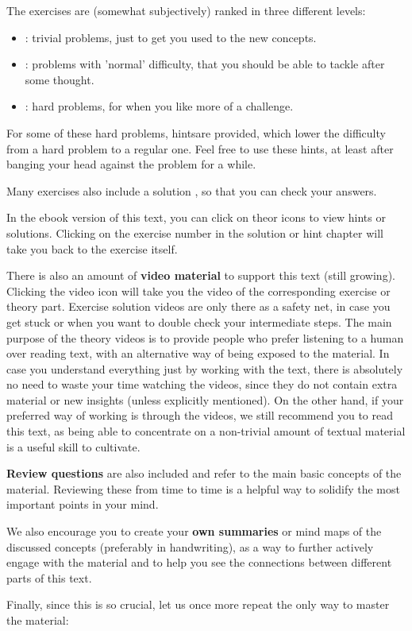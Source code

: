 The exercises are (somewhat subjectively) ranked in three different levels:

\begin{itemize}
\item \iconoffset\trivial : trivial problems, just to get you used to the new concepts.
\item \iconoffset\normal : problems with 'normal' difficulty, that you should be able to tackle after some thought.
\item \iconoffset\hard : hard problems, for when you like more of a challenge.
\end{itemize}

For some of these hard problems, hints\iconoffset\hint are provided, which lower the difficulty from a hard problem to a regular one. Feel free to use these hints, at least after banging your head against the problem for a while.

Many exercises also include a solution \iconoffset\solution, so that you can check your answers.

In the ebook version of this text, you can click on the\iconoffset\hint or \iconoffset\solution icons to view hints or solutions. Clicking on the exercise number in the solution or hint chapter will take you back to the exercise itself.

There is also an amount of \textbf{video material} to support this text (still growing). Clicking the video icon \iconoffset\youtube will take you the video of the corresponding exercise or theory part. Exercise solution videos are only there as a safety net, in case you get stuck or when you want to double check your intermediate steps. The main purpose of the theory videos is to provide people who prefer listening to a human over reading text, with an alternative way of being exposed to the material. In case you understand everything just by working with the text, there is absolutely no need to waste your time watching the videos, since they do not contain extra material or new insights (unless explicitly mentioned). On the other hand, if your preferred way of working is through the videos, we still recommend you to read this text, as being able to concentrate on a non-trivial amount of textual material is a useful skill to cultivate.

\textbf{Review questions} are also included and refer to the main basic concepts of the material. Reviewing these from time to time is a helpful way to solidify the most important points in your mind.

We also encourage you to create your \textbf{own summaries} or mind maps of the discussed concepts (preferably in handwriting), as a way to further actively engage with the material and to help you see the connections between different parts of this text.

Finally, since this is so crucial, let us once more repeat the only way to master the material:
\\



